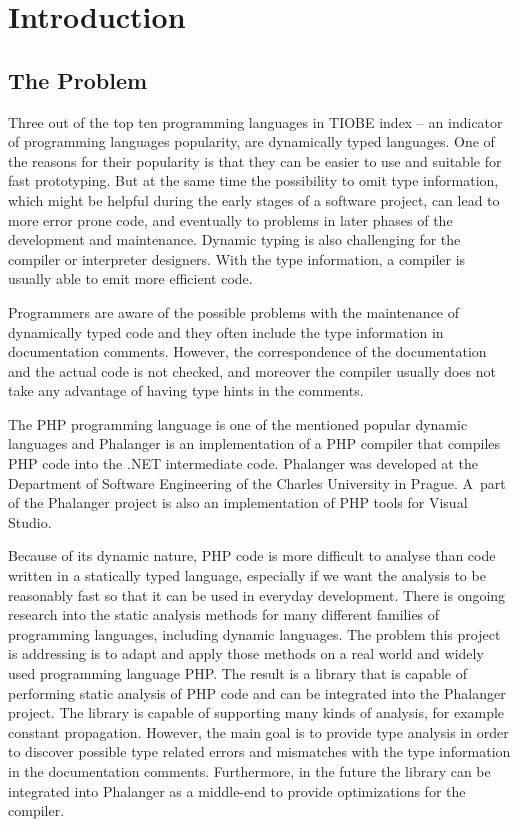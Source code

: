 \chapter{Introduction}

    \section{The Problem}
    
    Three out of the top ten programming languages in TIOBE index\cite{tiobe} -- 
    an indicator of programming languages popularity, are dynamically typed languages. 
    One of the reasons for their popularity is that they can be easier to 
    use and suitable for fast prototyping.
    But at the same time the possibility to omit type information, which might 
    be helpful during the early stages of a software project, can lead to more 
    error prone code, and eventually to problems in later phases of the 
    development and maintenance. Dynamic typing is also challenging for the 
    compiler or interpreter designers. With the type information, 
    a compiler is usually able to emit more efficient code.
    
    Programmers are aware of the possible problems with the maintenance of 
    dynamically typed code and they often include the type information in 
    documentation comments. However, the correspondence of the documentation 
    and the actual code is not checked, and moreover the compiler usually 
    does not take any advantage of having type hints in the comments.
    
    The PHP programming language is one of the mentioned popular dynamic 
    languages and Phalanger \cite{benda2006phalanger} is an implementation 
    of a PHP compiler that compiles PHP code into the .NET intermediate code. 
    Phalanger was developed at the Department of Software Engineering 
    of the Charles University in Prague. A~part of the Phalanger 
    project is also an implementation of PHP tools for 
    Visual Studio.

    Because of its dynamic nature, PHP code is more difficult to analyse 
    than code written in a statically typed language, especially if we want the 
    analysis to be reasonably fast so that it can be used 
    in everyday development.  There is ongoing research into the 
    static analysis methods for many different families of programming languages, 
    including dynamic languages. The problem this project is addressing 
    is to adapt and apply those methods on a real world and widely 
    used programming language PHP. The result is a library that is capable of 
    performing static analysis of PHP code and can be integrated into 
    the Phalanger project. The library is capable of supporting many 
    kinds of analysis, for example constant propagation. However, the main goal 
    is to provide type analysis in order to discover possible type 
    related errors and mismatches with the type information in the 
    documentation comments. Furthermore, in the future the library 
    can be integrated into Phalanger as a middle-end to provide 
    optimizations for the compiler.

